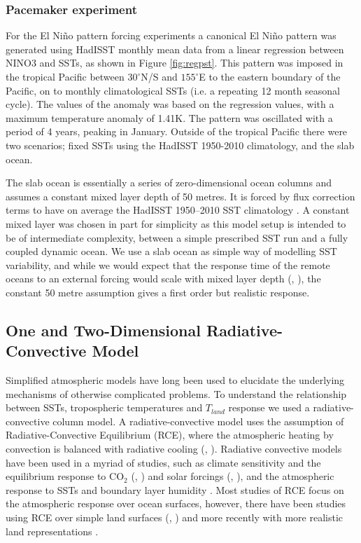 \subsubsection{Pacemaker experiment}\label{methods:pacemaker}
For the El Ni{\~n}o pattern forcing experiments a canonical El Ni{\~n}o pattern 
was generated using HadISST monthly mean data from a linear regression between 
NINO3 and SSTs, as shown in Figure \ref{fig:regpst}. This pattern was imposed in 
the tropical Pacific between $30^{\circ}$N/S and $155^{\circ}$E to the eastern 
boundary of the Pacific, on to monthly climatological SSTs (i.e. a repeating 12 
month seasonal cycle).  The values of the anomaly was based on the regression 
values, with a maximum temperature anomaly of 1.41K.  The pattern was oscillated 
with a period of 4 years, peaking in January.  Outside of the tropical Pacific 
there were two scenarios; fixed SSTs using the HadISST 1950-2010 climatology, 
and the slab ocean.  

The slab ocean is essentially a series of zero-dimensional ocean columns and 
assumes a constant mixed layer depth of 50 metres. It is forced by flux 
correction terms to have on average the HadISST 1950--2010 SST climatology 
\citep{Wang2014}. A constant mixed layer was chosen in part for simplicity as 
this model setup is intended to be of intermediate complexity, between a simple 
prescribed SST run and a fully coupled dynamic ocean. We use a slab ocean as 
simple way of modelling SST variability, and while we would expect that the 
response time of the remote oceans to an external forcing would scale with mixed 
layer depth (\citealt{Su2005a}, \citealt{Lintner2007}), the constant 50 metre 
assumption gives a first order but realistic response.  


\subsection{One and Two-Dimensional Radiative-Convective Model}
Simplified atmospheric models have long been used to elucidate the underlying 
mechanisms of otherwise complicated problems. To understand the relationship 
between SSTs, tropospheric temperatures and $T_{land}$ response we used a 
radiative-convective column model. A radiative-convective model uses the 
assumption of Radiative-Convective Equilibrium (RCE), where the atmospheric 
heating by convection is balanced with radiative cooling (\citet{Manabe1964}, 
\citet{Manabe1965}). Radiative convective models have been used in a myriad of 
studies, such as climate sensitivity and the equilibrium response to CO$_2$ 
(\citet{Manabe1975}, \citet{Augustsson1977}) and solar forcings 
(\citet{Wetherald1975}, \citet{Renno1994}), and the atmospheric response to SSTs 
and boundary layer humidity \citep{Ramsay2011}. Most studies of RCE focus on the 
atmospheric response over ocean surfaces, however, there have been studies using 
RCE over simple land surfaces (\citet{Renno1997}, \citet{Abbot2007}) and more 
recently with more realistic land representations \citep{Rochetin2014}.


